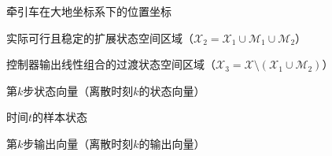 \begin{denotation}[3cm]
  \item[{$X_1,Y_1$}] 牵引车在大地坐标系下的位置坐标
  \item[{$\mathcal{X}_2$}] 实际可行且稳定的扩展状态空间区域（$\mathcal{X}_2 = \mathcal{X}_1 \cup \mathcal{M}_1 \cup \mathcal{M}_2$）
  \item[{$\mathcal{X}_3$}] 控制器输出线性组合的过渡状态空间区域（$\mathcal{X}_3 = \mathcal{X} \setminus (\mathcal{X}_1 \cup \mathcal{M}_2)$）
  \item[{$x_k$}] 第$k$步状态向量（离散时刻$k$的状态向量）
  \item[{$x_t$}] 时间$t$的样本状态
  \item[{$y_k$}] 第$k$步输出向量（离散时刻$k$的输出向量）
\end{denotation}
